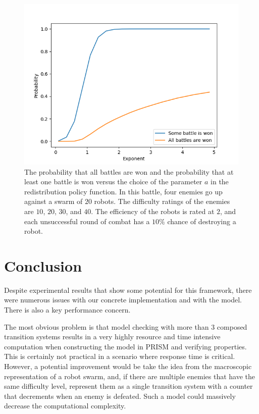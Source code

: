 \documentclass[11pt]{article}
\theoremstyle{definition}
\begin{document}
\begin{figure}
    \label{fig:some-all-battle-won}
    \begin{center}
        \includegraphics{../figs/some-all-probability-vs-exp.png}
    \end{center}
    \caption{
        The probability that all battles are won and the probability that at
        least one battle is won versus the choice of the parameter $a$ in the
        redistribution policy function.
        In this battle, four enemies go up against a swarm of $20$ robots.
        The difficulty ratings of the enemies are $10$, $20$, $30$, and $40$.
        The efficiency of the robots is rated at $2$, and each unsuccessful
        round of combat has a $10\%$ chance of destroying a robot.
    }
\end{figure}

\section{Conclusion}
\label{sec:conclusion}

Despite experimental results that show some potential for this framework,
there were numerous issues with our concrete implementation
and with the model. There is also a key performance concern.

The most obvious problem is that model checking
with more than 3 composed transition systems results
in a very highly resource and time intensive computation
when constructing the model in PRISM and verifying
properties. This is certainly not practical in a
scenario where response time is critical. However,
a potential improvement would be take the idea from
the macroscopic representation of a robot swarm,
and, if there are multiple enemies that have the same
difficulty level, represent them as a single transition
system with a counter that decrements when
an enemy is defeated. Such a model
could massively decrease the computational
complexity.
\end{document}
